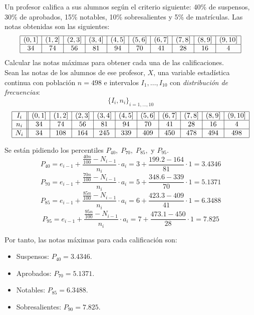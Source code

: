 \begin{ejercicio}
    Un profesor califica a sus alumnos según el criterio siguiente: 40\% de suspensos, 30\% de aprobados, 15\% notables, 10\% sobresalientes y 5\% de matrículas. Las notas obtenidas son las siguientes:
    \begin{equation*}
        \begin{array}{|c|c|c|c|c|c|c|c|c|c|}
            \hline 
             (0,1] & (1,2] & (2,3] & (3,4] & (4,5] & (5,6] & (6,7] & (7,8] & (8,9] & (9,10] \\ \hline
             34 & 74 & 56 & 81 & 94 & 70 & 41 & 28 & 16 & 4 \\ \hline
        \end{array}
    \end{equation*}
    Calcular las notas máximas para obtener cada una de las calificaciones.\\

     Sean las notas de los alumnos de ese profesor, $X$, una variable estadística continua con población $n=498$ e intervalos $I_1, \dots, I_10$ con \emph{distribución de frecuencias}:
        $$\{I_i, n_i\}_{i=1, \dots, 10}$$
    \begin{equation*}
        \begin{array}{|c||c|c|c|c|c|c|c|c|c|c|}
            \hline 
             I_i & (0,1] & (1,2] & (2,3] & (3,4] & (4,5] & (5,6] & (6,7] & (7,8] & (8,9] & (9,10] \\ \hline
             n_i & 34 & 74 & 56 & 81 & 94 & 70 & 41 & 28 & 16 & 4 \\ \hline
             N_i & 34 & 108 & 164 & 245 & 339 & 409 & 450 & 478 & 494 & 498 \\ \hline
        \end{array}
    \end{equation*}
        
    Se están pidiendo los percentiles $P_{40},\;P_{70},\;P_{85},$ y $P_{95}$.
    $$P_{40} = e_{i-1} + \frac{\frac{40n}{100} - N_{i-1}}{n_i}\cdot a_i
    = 3 + \frac{199.2 - 164}{81}\cdot 1 = 3.4346$$
    $$P_{70} = e_{i-1} + \frac{\frac{70n}{100} - N_{i-1}}{n_i}\cdot a_i
    = 5 + \frac{348.6 - 339}{70}\cdot 1 = 5.1371$$
    $$P_{85} = e_{i-1} + \frac{\frac{85n}{100} - N_{i-1}}{n_i}\cdot a_i
    = 6 + \frac{423.3 - 409}{41}\cdot 1 = 6.3488$$
    $$P_{95} = e_{i-1} + \frac{\frac{95n}{100} - N_{i-1}}{n_i}\cdot a_i
    = 7 + \frac{473.1 - 450}{28}\cdot 1 = 7.825$$

    Por tanto, las notas máximas para cada calificación son:
    \begin{itemize}
        \item Suspensos: $P_{40} = 3.4346$.
        \item Aprobados: $P_{70} = 5.1371$.
        \item Notables: $P_{85} = 6.3488$.
        \item Sobresalientes: $P_{90} = 7.825$.
    \end{itemize}
\end{ejercicio}

